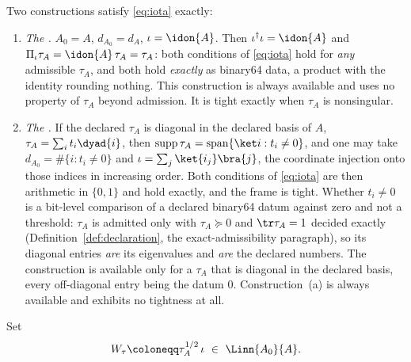 \begin{definition}
Two constructions satisfy \eqref{eq:iota} exactly:
\begin{enumerate}[label=(\alph*),leftmargin=2.2em]
\item \emph{The
  .}
  $A_0=A$, $d_{A_0}=d_A$, $\iota=\idon{A}$.
  Then $\iota^{\dagger}\iota=\idon{A}$ and
  $\Pi_{\iota}\tau_A=\idon{A}\,\tau_A=\tau_A$: both conditions of
  \eqref{eq:iota} hold for \emph{any} admissible $\tau_A$, and both hold
  \emph{exactly} as binary64 data, a product with the identity rounding
  nothing. This construction is always available and uses no property of
  $\tau_A$ beyond admission. It is tight exactly when $\tau_A$ is
  nonsingular.
\item \emph{The
  .}
  If the declared $\tau_A$ is diagonal in
  the declared basis of $A$, $\tau_A=\sum_it_i\dyad{i}$, then
  $\operatorname{supp}\tau_A=\operatorname{span}\{\ket i:t_i\neq0\}$, and
  one may take $d_{A_0}=\#\{i:t_i\neq0\}$ and
  $\iota=\sum_j\ket{i_j}\bra{j}$, the coordinate injection onto those
  indices in increasing order. Both conditions of \eqref{eq:iota} are then
  arithmetic in $\{0,1\}$ and hold exactly, and the frame is tight.
  Whether $t_i\neq0$ is a bit-level comparison of a declared binary64
  datum against zero and not a threshold: $\tau_A$ is admitted only with
  $\tau_A\succeq0$ and $\tr\tau_A=1$ decided exactly
  (Definition~\ref{def:declaration}, the exact-admissibility paragraph), so
  its diagonal entries \emph{are}
  its eigenvalues and \emph{are} the declared numbers.
  The construction is available only for a $\tau_A$ that is diagonal in the
  declared basis, every off-diagonal entry being the datum $0$.
  Construction~(a) is always available
  and exhibits no tightness at all.
\end{enumerate}
Set
\begin{equation}\label{eq:Wtau}
  W_{\tau}\coloneqq\tau_A^{1/2}\,\iota\ \in\ \Linn{A_0}{A}.
\end{equation}
\end{definition}

